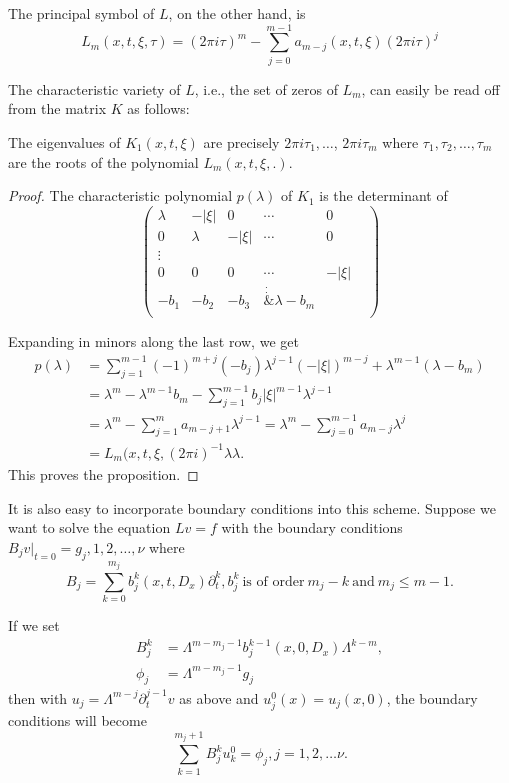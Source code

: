 The principal symbol of $L$, on the other hand, is 
$$
L_m (x,t,\xi,\tau)= (2 \pi i \tau)^m - \sum_{j=0}^{m-1}
a_{m-j}(x,t,\xi) (2 \pi i \tau)^j 
$$

The characteristic variety of $L$, i.e., the set of zeros of $L_m $, can
easily be read off from the matrix $K$ as follows: 

\setcounter{prop}{56}
\begin{prop}\label{chap4:sec10:prop4.57}%
  The eigenvalues of $K_1 (x, t, \xi)$ are precisely  $2 \pi i
  \tau_1, \ldots$, $2 \pi i \tau_m $ where $\tau_1, \tau_2, \ldots,
  \tau_m$ are the roots of the polynomial $L_m (x,t, \xi, .)$. 
\end{prop}

\begin{proof}
  The characteristic polynomial $p(\lambda) $ of $K_1$ is the determinant of 
  $$
  \begin{pmatrix}
    \lambda & - | \xi |& 0 &\cdots& 0\\
    0& \lambda & - |\xi|& \cdots& 0\\
    \vdots& & & & & \\
    0&0&0&\cdots& -|\xi |\\
    -b_1&-b_2& -b_3& \dot \dot &   \lambda- b_m\\
  \end{pmatrix}
  $$\pageoriginale

Expanding in minors along the last row, we get 
\begin{align*}
  p(\lambda) &= \sum_{j=1}^{m-1} (-1)^{m+j} (-b_j) \lambda^{j-1} (- |
  \xi |) ^{m-j} + \lambda^{m-1} ( \lambda-b_m) \\ 
  &= \lambda^m - \lambda^{m-1} b_m - \sum_{j=1}^{m-1} b_j | \xi |^{m-1}
  \lambda^{j-1}\\ 
  &= \lambda^m - \sum_{j=1}^{m} a_{m-j+1}\lambda^{j-1} = \lambda^m -
  \sum_{j=0}^{m-1} a_{m-j}\lambda^j\\ 
  &= L_m (x, t, \xi, ( 2 \pi i ) ^{-1} \lambda \lambda.
\end{align*}
This proves the proposition.
\end{proof}

It is also easy to incorporate boundary conditions into this
scheme. Suppose we want to solve the equation $Lv=f $ with the
boundary conditions $ B_j v |_{t=0} = g_j,  1,2, \ldots, \nu $ where  
$$
B_j = \sum_{k=0}^{m_{j}} b_j^k (x,t,D_x) \partial _t ^k,  b_j ^k
~\text{is of order}~ m_j -k ~\text{and}~  m_j \leq m-1. 
$$

If we set 
\begin{align*}
  B_j^k &= \Lambda^{m-m_{j}-1} b_j ^{k-1}(x,0,D_x) \Lambda ^{k-m},\\
  \phi_j&= \Lambda^{m-m_{j}-1} g_j
\end{align*}
then with $u_j = \Lambda ^{m-j} \partial_t ^{j-1}v$ as above and  $
u_j ^0(x) =u _j (x,0)$, the boundary conditions will become 
$$
\sum _{k=1}^{m_{j}+1} B_j ^k u_k^0 = \phi _j,  j = 1,2,\ldots \nu.		
$$\pageoriginale


